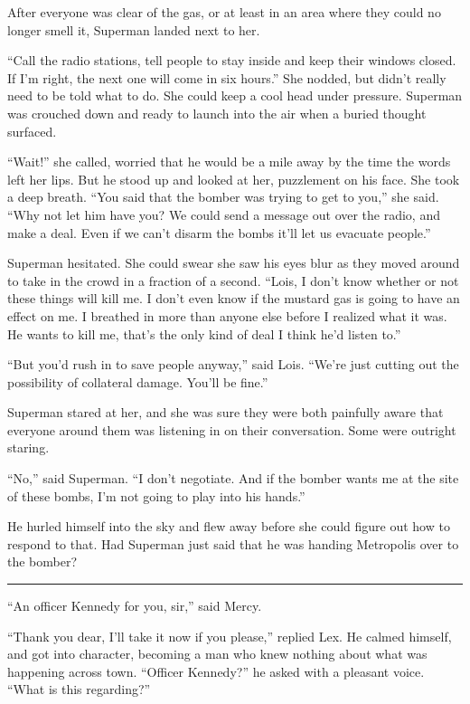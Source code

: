 \documentclass[ebook,12pt]{memoir}
\begin{document}
After everyone was clear of the gas, or at least in an area where they
could no longer smell it, Superman landed next to her.

``Call the radio stations, tell people to stay inside and keep their
windows closed. If I'm right, the next one will come in six hours.'' She
nodded, but didn't really need to be told what to do. She could keep a
cool head under pressure. Superman was crouched down and ready to launch
into the air when a buried thought surfaced.

``Wait!'' she called, worried that he would be a mile away by the time
the words left her lips. But he stood up and looked at her, puzzlement
on his face. She took a deep breath. ``You said that the bomber was
trying to get to you,'' she said. ``Why not let him have you? We could
send a message out over the radio, and make a deal. Even if we can't
disarm the bombs it'll let us evacuate people.''

Superman hesitated. She could swear she saw his eyes blur as they moved
around to take in the crowd in a fraction of a second. ``Lois, I don't
know whether or not these things will kill me. I don't even know if the
mustard gas is going to have an effect on me. I breathed in more than
anyone else before I realized what it was. He wants to kill me, that's
the only kind of deal I think he'd listen to.''

``But you'd rush in to save people anyway,'' said Lois. ``We're just
cutting out the possibility of collateral damage. You'll be fine.''

Superman stared at her, and she was sure they were both painfully aware
that everyone around them was listening in on their conversation. Some
were outright staring.

``No,'' said Superman. ``I don't negotiate. And if the bomber wants me
at the site of these bombs, I'm not going to play into his hands.''

He hurled himself into the sky and flew away before she could figure out
how to respond to that. Had Superman just said that he was handing
Metropolis over to the bomber?

\begin{center}\rule{0.5\linewidth}{\linethickness}\end{center}

``An officer Kennedy for you, sir,'' said Mercy.

``Thank you dear, I'll take it now if you please,'' replied Lex. He
calmed himself, and got into character, becoming a man who knew nothing
about what was happening across town. ``Officer Kennedy?'' he asked with
a pleasant voice. ``What is this regarding?''
\end{document}
